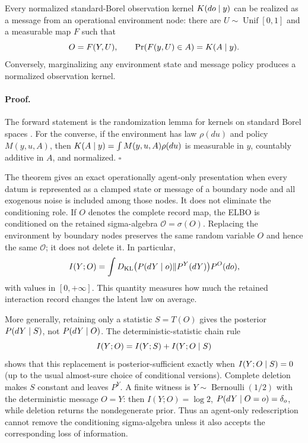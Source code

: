 Every normalized standard-Borel observation kernel $K(do\mid y)$ can be
realized as a message from an operational environment node: there are
$U\sim\operatorname{Unif}[0,1]$ and a measurable map $F$ such that
\begin{equation}
O=F(Y,U),
\qquad
\Pr(F(y,U)\in A)=K(A\mid y).
\label{eq:obs-randomization}
\end{equation}
Conversely, marginalizing any environment state and message policy produces a
normalized observation kernel.  

\paragraph{Proof.}
The forward statement is the randomization lemma for kernels on standard
Borel spaces \citep{Kallenberg2021}.  For the converse, if the environment has
law $\rho(du)$ and policy $M(y,u,A)$, then
$K(A\mid y)=\int M(y,u,A)\rho(du)$ is measurable in $y$, countably additive
in $A$, and normalized.  $\square$

The theorem gives an exact operationally agent-only presentation when every
datum is represented as a clamped state or message of a boundary node and all
exogenous noise is included among those nodes.  It does not eliminate the
conditioning role.  If $O$ denotes the complete record map, the ELBO is
conditioned on the retained sigma-algebra $\mathscr O=\sigma(O)$.  Replacing
the environment by boundary nodes preserves the same random variable $O$ and
hence the same $\mathscr O$; it does not delete it.  In particular,
\begin{equation}
I(Y;O)=\int
D_{\mathrm{KL}}\bigl(P(dY\mid o)\Vert P^Y(dY)\bigr)P^O(do),
\label{eq:obs-conditioning-information}
\end{equation}
with values in $[0,+\infty]$.  This quantity measures how much the retained
interaction record changes the latent law on average.  

More generally, retaining only a statistic $S=T(O)$ gives the posterior
$P(dY\mid S)$, not $P(dY\mid O)$.  The deterministic-statistic chain rule
\begin{equation}
I(Y;O)=I(Y;S)+I(Y;O\mid S)
\label{eq:obs-conditioning-statistic-chain}
\end{equation}
shows that this replacement is posterior-sufficient exactly when
$I(Y;O\mid S)=0$ (up to the usual almost-sure choice of conditional
versions).  Complete deletion makes $S$ constant and leaves $P^Y$.  A finite
witness is $Y\sim\operatorname{Bernoulli}(1/2)$ with the deterministic message
$O=Y$: then $I(Y;O)=\log2$, $P(dY\mid O=o)=\delta_o$, while deletion returns
the nondegenerate prior.  Thus an agent-only redescription cannot remove the
conditioning sigma-algebra unless it also accepts the corresponding loss of
information.  

